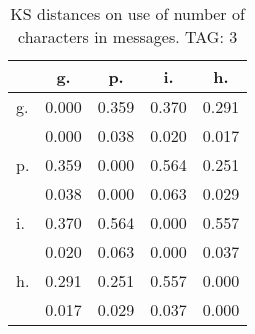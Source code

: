 \begin{table}[h!]
\begin{center}
\begin{tabular}{| l | c | c | c | c |}\hline
 & g. & p. & i. & h. \\\hline
g. & 0.000  & 0.359  & 0.370  & 0.291 \\\hline
 & 0.000  & 0.038  & 0.020  & 0.017 \\\hline
p. & 0.359  & 0.000  & 0.564  & 0.251 \\\hline
 & 0.038  & 0.000  & 0.063  & 0.029 \\\hline
i. & 0.370  & 0.564  & 0.000  & 0.557 \\\hline
 & 0.020  & 0.063  & 0.000  & 0.037 \\\hline
h. & 0.291  & 0.251  & 0.557  & 0.000 \\\hline
 & 0.017  & 0.029  & 0.037  & 0.000 \\\hline
\end{tabular}
\caption{KS distances on use of number of characters in messages. TAG: 3}
\end{center}
\end{table}